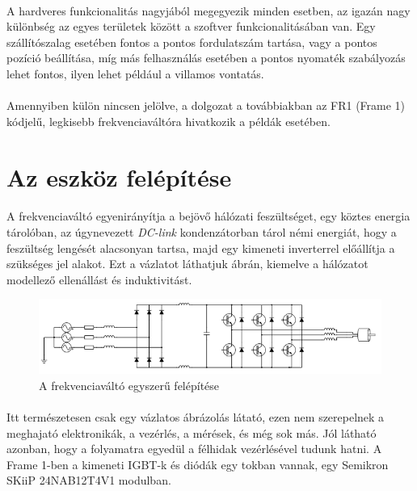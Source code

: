 \paragraph{}
A hardveres funkcionalitás nagyjából megegyezik minden esetben, az igazán nagy különbség az egyes területek között a szoftver funkcionalitásában van. Egy szállítószalag esetében fontos a pontos fordulatszám tartása, vagy a pontos pozíció beállítása, míg más felhasználás esetében a pontos nyomaték szabályozás lehet fontos, ilyen lehet például a villamos vontatás.

\paragraph{}
Amennyiben külön nincsen jelölve, a dolgozat a továbbiakban az FR1 (Frame 1) kódjelű, legkisebb frekvenciaváltóra hivatkozik a példák esetében.

\section{Az eszköz felépítése}

\paragraph{}
A frekvenciaváltó egyenirányítja a bejövő hálózati feszültséget, egy köztes energia tárolóban, az úgynevezett \emph{DC-link} kondenzátorban tárol némi energiát, hogy a feszültség lengését alacsonyan tartsa, majd egy kimeneti inverterrel előállítja a szükséges jel alakot. Ezt a vázlatot láthatjuk  ábrán, kiemelve a hálózatot modellező ellenállást és induktivitást.

\begin{figure}[h]
	\centering
	\includegraphics[width = \textwidth]{figures/VFDschematic_choke.png}
	\caption{A frekvenciaváltó egyszerű felépítése} 
	\label{fig:vfd_schema}
\end{figure}

\paragraph{}
Itt természetesen csak egy vázlatos ábrázolás látató, ezen nem szerepelnek a meghajató elektronikák, a vezérlés, a mérések, és még sok más. Jól látható azonban, hogy a folyamatra egyedül a félhidak vezérlésével tudunk hatni. A Frame 1-ben a kimeneti IGBT-k és diódák egy tokban vannak, egy Semikron SKiiP 24NAB12T4V1 modulban.

